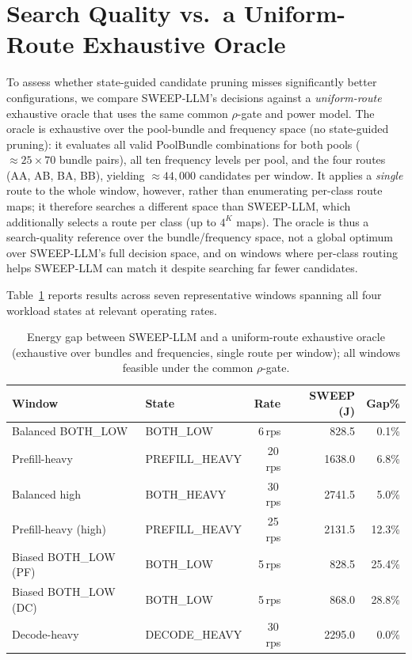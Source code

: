 
\section{Search Quality vs.\ a Uniform-Route Exhaustive Oracle}
\label{sec:eval_oracle}

To assess whether state-guided candidate pruning misses significantly better configurations, we compare SWEEP-LLM's decisions against a \emph{uniform-route} exhaustive oracle that uses the same common $\rho$-gate and power model.
The oracle is exhaustive over the pool-bundle and frequency space (no state-guided pruning): it evaluates all valid PoolBundle combinations for both pools (${\approx}25{\times}70$ bundle pairs), all ten frequency levels per pool, and the four routes (AA, AB, BA, BB), yielding ${\approx}44{,}000$ candidates per window.
It applies a \emph{single} route to the whole window, however, rather than enumerating per-class route maps; it therefore searches a different space than SWEEP-LLM, which additionally selects a route per class (up to $4^{K}$ maps). The oracle is thus a search-quality reference over the bundle/frequency space, not a global optimum over SWEEP-LLM's full decision space, and on windows where per-class routing helps SWEEP-LLM can match it despite searching far fewer candidates.

Table~\ref{tab:oracle_gap} reports results across seven representative windows spanning all four workload states at relevant operating rates.

\begin{table}[!t]
\centering
\caption{Energy gap between SWEEP-LLM and a uniform-route exhaustive oracle (exhaustive over bundles and frequencies, single route per window); all windows feasible under the common $\rho$-gate.}
\label{tab:oracle_gap}
\small
\begin{tabular}{llrrr}
\toprule
Window & State & Rate & SWEEP (J) & Gap\% \\
\midrule
Balanced BOTH\_LOW & BOTH\_LOW & 6\,rps & 828.5 & 0.1\% \\
Prefill-heavy & PREFILL\_HEAVY & 20\,rps & 1638.0 & 6.8\% \\
Balanced high & BOTH\_HEAVY & 30\,rps & 2741.5 & 5.0\% \\
Prefill-heavy (high) & PREFILL\_HEAVY & 25\,rps & 2131.5 & 12.3\% \\
Biased BOTH\_LOW (PF) & BOTH\_LOW & 5\,rps & 828.5 & 25.4\% \\
Biased BOTH\_LOW (DC) & BOTH\_LOW & 5\,rps & 868.0 & 28.8\% \\
Decode-heavy & DECODE\_HEAVY & 30\,rps & 2295.0 & 0.0\% \\
\bottomrule
\end{tabular}
\end{table}

